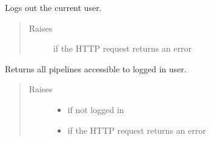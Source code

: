 \documentclass[letterpaper,10pt,english]{sphinxmanual}
\begin{document}
\begin{fulllineitems}
\begin{fulllineitems}
\begin{quote}
\begin{description}
\end{description}\end{quote}

\end{fulllineitems}


\begin{fulllineitems}
\label{\detokenize{autoapi/pine/client/index:pine.client.PineClient.logout}}
Logs out the current user.
\begin{quote}\begin{description}
\item[{Raises}] \leavevmode
{\hyperref[\detokenize{autoapi/pine/client/exceptions/index:pine.client.exceptions.PineClientHttpException}]{}} \textendash{} if the HTTP request returns an error

\end{description}\end{quote}

\end{fulllineitems}


\begin{fulllineitems}
\label{\detokenize{autoapi/pine/client/index:pine.client.PineClient.get_pipelines}}
Returns all pipelines accessible to logged in user.
\begin{quote}\begin{description}
\item[{Raises}] \leavevmode\begin{itemize}
\item {} 
{\hyperref[\detokenize{autoapi/pine/client/exceptions/index:pine.client.exceptions.PineClientAuthException}]{}} \textendash{} if not logged in

\item {} 
{\hyperref[\detokenize{autoapi/pine/client/exceptions/index:pine.client.exceptions.PineClientHttpException}]{}} \textendash{} if the HTTP request returns an error


\end{itemize}
\end{description}
\end{quote}
\end{fulllineitems}
\end{fulllineitems}
\end{document}
